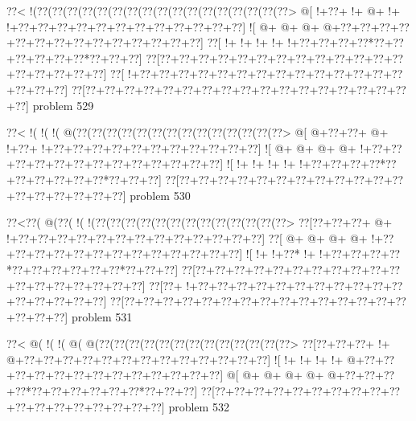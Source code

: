 \vbox{\vbox{\goo
\0??<\- !(\0??(\0??(\0??(\0??(\0??(\0??(\0??(\0??(\0??(\0??(\0??(\0??(\0??(\0??(\0??(\0??(\0??>
\- @[\- !+\0??+\- !+\- @+\- !+\- !+\0??+\0??+\0??+\0??+\0??+\0??+\0??+\0??+\0??+\0??+\0??+\0??]
\- ![\- @+\- @+\- @+\- @+\0??+\0??+\0??+\0??+\0??+\0??+\0??+\0??+\0??+\0??+\0??+\0??+\0??+\0??]
\0??[\- !+\- !+\- !+\- !+\- !+\0??+\0??+\0??+\0??*\0??+\0??+\0??+\0??+\0??+\0??*\0??+\0??+\0??]
\0??[\0??+\0??+\0??+\0??+\0??+\0??+\0??+\0??+\0??+\0??+\0??+\0??+\0??+\0??+\0??+\0??+\0??+\0??]
\0??[\- !+\0??+\0??+\0??+\0??+\0??+\0??+\0??+\0??+\0??+\0??+\0??+\0??+\0??+\0??+\0??+\0??+\0??]
\0??[\0??+\0??+\0??+\0??+\0??+\0??+\0??+\0??+\0??+\0??+\0??+\0??+\0??+\0??+\0??+\0??+\0??+\0??]
}
\hfil problem 529\hfil\break
}



\vbox{\vbox{\goo
\0??<\- !(\- !(\- !(\- @(\0??(\0??(\0??(\0??(\0??(\0??(\0??(\0??(\0??(\0??(\0??(\0??(\0??(\0??>
\- @[\- @+\0??+\0??+\- @+\- !+\0??+\- !+\0??+\0??+\0??+\0??+\0??+\0??+\0??+\0??+\0??+\0??+\0??]
\- ![\- @+\- @+\- @+\- @+\- !+\0??+\0??+\0??+\0??+\0??+\0??+\0??+\0??+\0??+\0??+\0??+\0??+\0??]
\- ![\- !+\- !+\- !+\- !+\- !+\0??+\0??+\0??+\0??*\0??+\0??+\0??+\0??+\0??+\0??*\0??+\0??+\0??]
\0??[\0??+\0??+\0??+\0??+\0??+\0??+\0??+\0??+\0??+\0??+\0??+\0??+\0??+\0??+\0??+\0??+\0??+\0??]
}
\hfil problem 530\hfil\break
}



\vbox{\vbox{\goo
\0??<\0??(\- @(\0??(\- !(\- !(\0??(\0??(\0??(\0??(\0??(\0??(\0??(\0??(\0??(\0??(\0??(\0??(\0??>
\0??[\0??+\0??+\0??+\- @+\- !+\0??+\0??+\0??+\0??+\0??+\0??+\0??+\0??+\0??+\0??+\0??+\0??+\0??]
\0??[\- @+\- @+\- @+\- @+\- !+\0??+\0??+\0??+\0??+\0??+\0??+\0??+\0??+\0??+\0??+\0??+\0??+\0??]
\- ![\- !+\- !+\0??*\- !+\- !+\0??+\0??+\0??+\0??*\0??+\0??+\0??+\0??+\0??+\0??*\0??+\0??+\0??]
\0??[\0??+\0??+\0??+\0??+\0??+\0??+\0??+\0??+\0??+\0??+\0??+\0??+\0??+\0??+\0??+\0??+\0??+\0??]
\0??[\0??+\- !+\0??+\0??+\0??+\0??+\0??+\0??+\0??+\0??+\0??+\0??+\0??+\0??+\0??+\0??+\0??+\0??]
\0??[\0??+\0??+\0??+\0??+\0??+\0??+\0??+\0??+\0??+\0??+\0??+\0??+\0??+\0??+\0??+\0??+\0??+\0??]
}
\hfil problem 531\hfil\break
}



\vbox{\vbox{\goo
\0??<\- @(\- !(\- !(\- @(\- @(\0??(\0??(\0??(\0??(\0??(\0??(\0??(\0??(\0??(\0??(\0??(\0??(\0??>
\0??[\0??+\0??+\0??+\- !+\- @+\0??+\0??+\0??+\0??+\0??+\0??+\0??+\0??+\0??+\0??+\0??+\0??+\0??]
\- ![\- !+\- !+\- !+\- !+\- @+\0??+\0??+\0??+\0??+\0??+\0??+\0??+\0??+\0??+\0??+\0??+\0??+\0??]
\- @[\- @+\- @+\- @+\- @+\- @+\0??+\0??+\0??+\0??*\0??+\0??+\0??+\0??+\0??+\0??*\0??+\0??+\0??]
\0??[\0??+\0??+\0??+\0??+\0??+\0??+\0??+\0??+\0??+\0??+\0??+\0??+\0??+\0??+\0??+\0??+\0??+\0??]
}
\hfil problem 532\hfil\break
}



